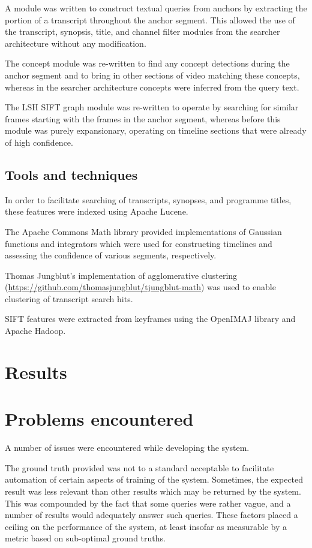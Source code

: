 \documentclass{../acm_proc_article-me11_tweaked}
\begin{document}
A module was written to construct textual queries from anchors by extracting 
the portion of a transcript throughout the anchor segment. This allowed the 
use of the transcript, synopsis, title, and channel filter modules from the 
searcher architecture without any modification.

The concept module was re-written to find any concept detections during the 
anchor segment and to bring in other sections of video matching these 
concepts, whereas in the searcher architecture concepts were inferred from the 
query text.

The LSH SIFT graph module was re-written to operate by searching for similar 
frames starting with the frames in the anchor segment, whereas before this 
module was purely expansionary, operating on timeline sections that were 
already of high confidence.

\subsection{Tools and techniques}
In order to facilitate searching of transcripts, synopses, and programme 
titles, these features were indexed using Apache Lucene.

The Apache Commons Math library provided implementations of Gaussian functions 
and integrators which were used for constructing timelines and assessing the 
confidence of various segments, respectively.

Thomas Jungblut's implementation of agglomerative clustering 
(\url{https://github.com/thomasjungblut/tjungblut-math}) was used to 
enable clustering of transcript search hits.

SIFT features were extracted from keyframes using the OpenIMAJ 
library\cite{Hare:2011:OIJ:2072298.2072421} and Apache Hadoop.

\section{Results}

\section{Problems encountered}
A number of issues were encountered while developing the system.

The ground truth provided was not to a standard acceptable to facilitate 
automation of certain aspects of training of the system. Sometimes, the 
expected result was less relevant than other results which may be returned by 
the system. This was compounded by the fact that some queries were rather 
vague, and a number of results would adequately answer such queries. These 
factors placed a ceiling on the performance of the system, at least insofar as 
measurable by a metric based on sub-optimal ground truths.
\end{document}
